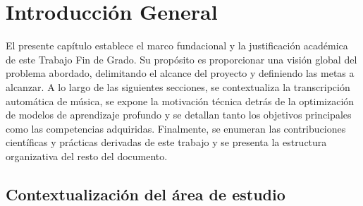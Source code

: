 \chapter{Introducción General}
El presente capítulo establece el marco fundacional y la justificación académica de este Trabajo Fin de Grado. Su propósito es proporcionar una visión global del problema abordado, delimitando el alcance del proyecto y definiendo las metas a alcanzar. A lo largo de las siguientes secciones, se contextualiza la transcripción automática de música, se expone la motivación técnica detrás de la optimización de modelos de aprendizaje profundo y se detallan tanto los objetivos principales como las competencias adquiridas. Finalmente, se enumeran las contribuciones científicas y prácticas derivadas de este trabajo y se presenta la estructura organizativa del resto del documento.


\section{Contextualización del área de estudio}

